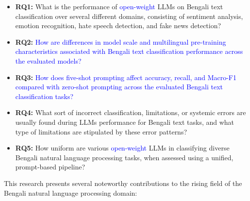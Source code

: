 \documentclass[10pt,letterpaper]{article}
\newcommand{\rev}[1]{\textcolor{blue}{#1}}
\begin{document}
\begin{itemize}
\setlength{\itemsep}{0pt}
\setlength{\parskip}{0pt}
    \item \textbf{RQ1:} What is the performance of \rev{open-weight} LLMs on Bengali text classification over several different domains, consisting of sentiment analysis, emotion recognition, hate speech detection, and fake news detection?
    \item \textbf{RQ2:} \rev{How are differences in model scale and multilingual pre-training characteristics associated with Bengali text classification performance across the evaluated models?}
    \item \textbf{RQ3:} \rev{How does five-shot prompting affect accuracy, recall, and Macro-F1 compared with zero-shot prompting across the evaluated Bengali text classification tasks?}
    \item \textbf{RQ4:} What sort of incorrect classification, limitations, or systemic errors are usually found during LLMs performance for Bengali text tasks, and what type of limitations are stipulated by these error patterns?
    \item \textbf{RQ5:} How uniform are various \rev{open-weight} LLMs in classifying diverse Bengali natural language processing tasks, when assessed using a unified, prompt-based pipeline?
\end{itemize}

This research presents several noteworthy contributions to the rising field of the Bengali natural language processing domain:
\end{document}
